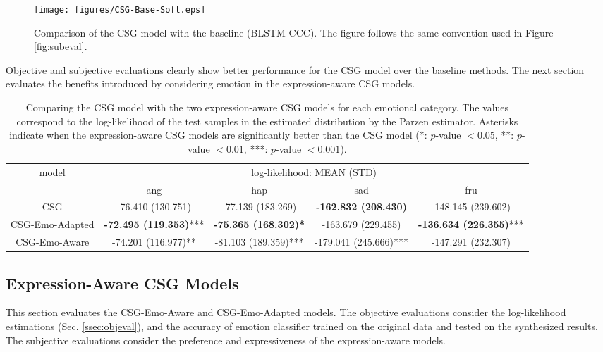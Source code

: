 \documentclass[10pt,journal,compsoc]{IEEEtran}
\begin{document}
\begin{figure}
	\centering
	\texttt{[image: figures/CSG-Base-Soft.eps]}
	\caption{Comparison of the CSG model with the baseline (BLSTM-CCC). The figure follows the same convention used in Figure \ref{fig:subeval}.}
	\label{fig:subevalcsgbase}
\end{figure}

Objective and subjective evaluations clearly show better performance for the CSG model over the baseline methods. The next section evaluates the benefits introduced by considering emotion in the expression-aware CSG models. 

\begin{table*}[t]
	\centering
	\caption{Comparing the CSG model with the two expression-aware CSG models for each emotional category. The values correspond to the log-likelihood of the test samples in the estimated distribution by the Parzen estimator. Asterisks indicate when the expression-aware CSG models are significantly better than the CSG model (*: $p$-value $<0.05$, **: $p$-value $<0.01$, ***: $p$-value $<0.001$).}
	\begin{tabular}{ c| c c c c }
		\hline
		\multirow{2}{*}{model}& \multicolumn{4}{c}{log-likelihood: MEAN (STD)}\\
		\cline{2-5}
		& ang & hap & sad & fru\\
		\hline\hline
		CSG &-76.410	(130.751)& -77.139	(183.269)&\textbf{-162.832	(208.430)}& -148.145	(239.602)\\
		CSG-Emo-Adapted &\textbf{-72.495	(119.353)}*** &\textbf{-75.365	(168.302)*}& -163.679	(229.455)&\textbf{-136.634	(226.355)}***\\
		CSG-Emo-Aware & -74.201	(116.977)**&-81.103	(189.359)***&-179.041	(245.666)***&-147.291	(232.307)\\
		\hline
	\end{tabular}
	\label{tab:ll-emo}
\end{table*}

\subsection{Expression-Aware CSG Models}
\label{ssec:emo-results}

This section evaluates the CSG-Emo-Aware and CSG-Emo-Adapted models. The objective evaluations consider the log-likelihood estimations (Sec. \ref{ssec:objeval}), and the accuracy of emotion classifier trained on the original data and tested on the synthesized results. The subjective evaluations consider the preference and expressiveness of the expression-aware models. 
\end{document}
